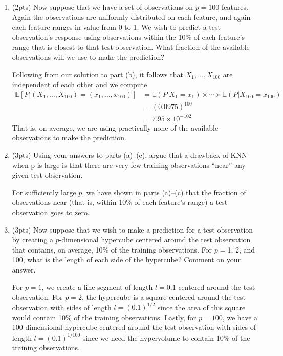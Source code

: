 \documentclass[a4paper]{article}
\theoremstyle{definition}
\newenvironment{soln}{
    \leavevmode\color{blue}\ignorespaces
}{}
\begin{document}
\begin{enumerate}
\begin{enumerate}
\begin{soln}
	\end{soln}
	
	\medskip

	\item (2pts) Now suppose that we have a set of observations on $p = 100$ features. Again the observations are uniformly distributed on each feature, and again each feature ranges in value from 0 to 1. We wish to predict a test observation’s response using observations within the 10\% of each feature’s range that is closest to that test observation. What fraction of the available observations will we use to make the prediction?
	
	\begin{soln}  Following from our solution to part (b), it follows that $X_1,\dots,X_{100}$ are independent of each other and we compute $$\begin{aligned}
		\mathbb{E}[P|(X_1,\dots,X_{100})=(x_1,\dots,x_{100})] &= \mathbb{E}(P|X_1=x_1)\times\cdots\times\mathbb{E}(P|X_{100} = x_{100}) \\[1ex]
		&= (0.0975)^{100} \\[1ex]
		&= 7.95\times10^{-102}
	\end{aligned}$$ That is, on average, we are using practically none of the available observations to make the prediction.
	\end{soln}
	
	\medskip

	\item (3pts) Using your answers to parts (a)–(c), argue that a drawback of KNN when p is large is that there are very few training observations “near” any given test observation.
	
	\begin{soln}  For sufficiently large $p$, we have shown in parts (a)–(c) that the fraction of observations near (that is, within 10\% of each feature's range) a test observation goes to zero. \end{soln}
	
	\medskip

	\item (3pts) Now suppose that we wish to make a prediction for a test observation by creating a $p$-dimensional hypercube centered around the test observation that contains, on average, 10\% of the training observations. For $p =$1, 2, and 100, what is the length of each side of the hypercube? 
	Comment on your answer.
	
	\begin{soln}  For $p=1$, we create a line segment of length $l = 0.1$ centered around the test observation. For $p=2$, the hypercube is a square centered around the test observation with sides of length $l = (0.1)^{1/2}$ since the area of this square would contain 10\% of the training observations. 
		Lastly, for $p=100$, we have a 100-dimensional hypercube centered around the test observation with sides of length $l = (0.1)^{1/100}$ since we need the hypervolume to contain 10\% of the training observations. \end{soln}
	

\end{enumerate}
\end{enumerate}
\end{document}
